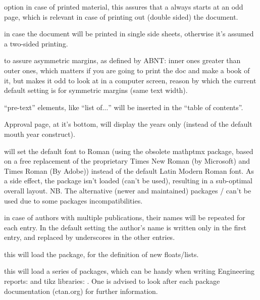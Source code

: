 \documentclass[article,nogeometry,english,tocdepth=3,secdepth=3]{ufrgscca} %
\begin{document}
\begin{describelist}{option}
	 { in case of printed material, this assures that a \tsmacro{\chapter}{} always starts at an odd page, which is relevant in case of printing out (double sided) the document.}

	 { in case the document will be printed in single side sheets, otherwise it's assumed a two-sided printing.}

	 {to assure asymmetric margins, as defined by ABNT: inner ones greater than outer ones, which matters if you are going to print the doc and make a book of it, but makes it odd to look at in a computer screen, reason by which the current default setting is for symmetric margins (same text width).}

     { “pre-text” elements, like “list of$\dots$” will be inserted in the “table of contents”.}

     { Approval page, at it’s bottom,  will display the years only (instead of the default mouth year construct).}

     { will set the default font to Roman (using the obsolete mathptmx package, based on  a free replacement of the proprietary 
    Times New Roman (by Microsoft) and Times Roman (By Adobe)) instead of the default Latin Modern Roman font. 
    As a side effect, the package  isn't loaded (can't be used), resulting in a sub-optimal overall layout. 
    NB. The alternative (newer and maintained) packages / can't be used due to some packages incompatibilities.}

	 { in case of authors with multiple publications, their names will be repeated for each entry. 
In the default setting the author's name is written only in the first entry, and replaced by underscores in the other entries.}

	 { this will load the  package, for the definition of new floats/lists.}

	 { this will load a series of packages, which can be handy when writing Engineering reports:
       and tikz libraries: . 
       One is advised to look after each package documentation (ctan.org) for further information.}


\end{describelist}
\end{document}
